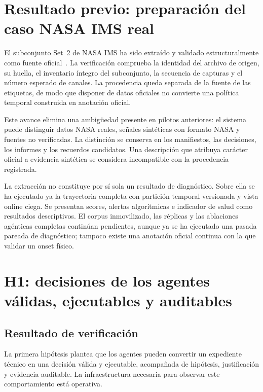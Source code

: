 \section{Resultado previo: preparación del caso NASA IMS real}

El subconjunto Set~2 de NASA IMS ha sido extraído y validado estructuralmente
como fuente oficial~\cite{nasa_pcoe_repository,nasa_ims_bearings_zip}. La
verificación comprueba la identidad del archivo de origen, su huella, el
inventario íntegro del subconjunto, la secuencia de capturas y el número
esperado de canales. La procedencia queda separada de la fuente de las
etiquetas, de modo que disponer de datos oficiales no convierte una política
temporal construida en anotación oficial.

Este avance elimina una ambigüedad presente en pilotos anteriores: el sistema
puede distinguir datos NASA reales, señales sintéticas con formato NASA y
fuentes no verificadas. La distinción se conserva en los manifiestos, las
decisiones, los informes y los recuerdos candidatos. Una descripción que
atribuya carácter oficial a evidencia sintética se considera incompatible con
la procedencia registrada.

La extracción no constituye por sí sola un resultado de diagnóstico. Sobre ella
se ha ejecutado ya la trayectoria completa con partición temporal versionada y
vista online ciega. Se presentan scores, alertas algorítmicas e indicador de
salud como resultados descriptivos. El corpus inmovilizado, las réplicas y las
ablaciones agénticas completas continúan pendientes, aunque ya se ha ejecutado
una pasada pareada de diagnóstico; tampoco existe una anotación oficial
continua con la que validar un onset físico.

\section{H1: decisiones de los agentes válidas, ejecutables y auditables}

\subsection{Resultado de verificación}

La primera hipótesis plantea que los agentes pueden convertir un expediente
técnico en una decisión válida y ejecutable, acompañada de hipótesis,
justificación y evidencia auditable. La infraestructura necesaria para observar
este comportamiento está operativa.

